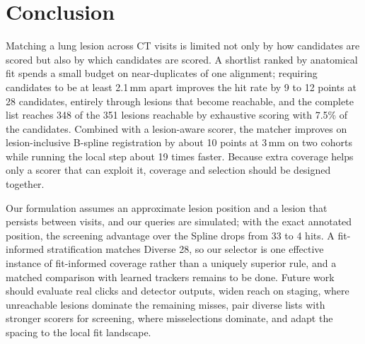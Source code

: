 \section{Conclusion}
\label{sec:conclusion}
\label{sec:discussion}
Matching a lung lesion across CT visits is limited not only by how candidates are scored but also by which candidates are scored.
A shortlist ranked by anatomical fit spends a small budget on near-duplicates of one alignment; requiring candidates to be at least 2.1\,mm apart improves the hit rate by 9 to 12 points at 28 candidates, entirely through lesions that become reachable, and the complete list reaches 348 of the 351 lesions reachable by exhaustive scoring with 7.5\% of the candidates.
Combined with a lesion-aware scorer, the matcher improves on lesion-inclusive B-spline registration by about 10 points at 3\,mm on two cohorts while running the local step about 19 times faster.
Because extra coverage helps only a scorer that can exploit it, coverage and selection should be designed together.

Our formulation assumes an approximate lesion position and a lesion that persists between visits, and our queries are simulated; with the exact annotated position, the screening advantage over the Spline drops from 33 to 4 hits.
A fit-informed stratification matches Diverse 28, so our selector is one effective instance of fit-informed coverage rather than a uniquely superior rule, and a matched comparison with learned trackers remains to be done.
Future work should evaluate real clicks and detector outputs, widen reach on staging, where unreachable lesions dominate the remaining misses, pair diverse lists with stronger scorers for screening, where misselections dominate, and adapt the spacing to the local fit landscape.
